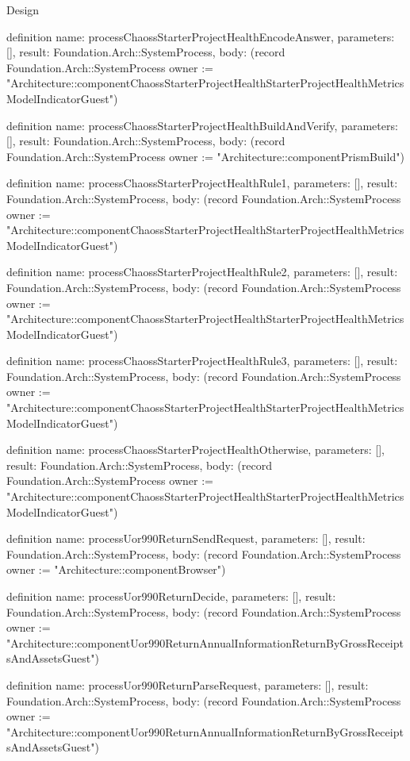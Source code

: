 \begin{lexlean}{Design}
\begin{semanticmodule}
definition{
  name: processChaossStarterProjectHealthEncodeAnswer,
  parameters: [],
  result: Foundation.Arch::SystemProcess,
  body: (record Foundation.Arch::SystemProcess {owner := "Architecture::componentChaossStarterProjectHealthStarterProjectHealthMetricsModelIndicatorGuest"})
}

definition{
  name: processChaossStarterProjectHealthBuildAndVerify,
  parameters: [],
  result: Foundation.Arch::SystemProcess,
  body: (record Foundation.Arch::SystemProcess {owner := "Architecture::componentPrismBuild"})
}

definition{
  name: processChaossStarterProjectHealthRule1,
  parameters: [],
  result: Foundation.Arch::SystemProcess,
  body: (record Foundation.Arch::SystemProcess {owner := "Architecture::componentChaossStarterProjectHealthStarterProjectHealthMetricsModelIndicatorGuest"})
}

definition{
  name: processChaossStarterProjectHealthRule2,
  parameters: [],
  result: Foundation.Arch::SystemProcess,
  body: (record Foundation.Arch::SystemProcess {owner := "Architecture::componentChaossStarterProjectHealthStarterProjectHealthMetricsModelIndicatorGuest"})
}

definition{
  name: processChaossStarterProjectHealthRule3,
  parameters: [],
  result: Foundation.Arch::SystemProcess,
  body: (record Foundation.Arch::SystemProcess {owner := "Architecture::componentChaossStarterProjectHealthStarterProjectHealthMetricsModelIndicatorGuest"})
}

definition{
  name: processChaossStarterProjectHealthOtherwise,
  parameters: [],
  result: Foundation.Arch::SystemProcess,
  body: (record Foundation.Arch::SystemProcess {owner := "Architecture::componentChaossStarterProjectHealthStarterProjectHealthMetricsModelIndicatorGuest"})
}

definition{
  name: processUor990ReturnSendRequest,
  parameters: [],
  result: Foundation.Arch::SystemProcess,
  body: (record Foundation.Arch::SystemProcess {owner := "Architecture::componentBrowser"})
}

definition{
  name: processUor990ReturnDecide,
  parameters: [],
  result: Foundation.Arch::SystemProcess,
  body: (record Foundation.Arch::SystemProcess {owner := "Architecture::componentUor990ReturnAnnualInformationReturnByGrossReceiptsAndAssetsGuest"})
}

definition{
  name: processUor990ReturnParseRequest,
  parameters: [],
  result: Foundation.Arch::SystemProcess,
  body: (record Foundation.Arch::SystemProcess {owner := "Architecture::componentUor990ReturnAnnualInformationReturnByGrossReceiptsAndAssetsGuest"})
}


\end{semanticmodule}
\end{lexlean}
